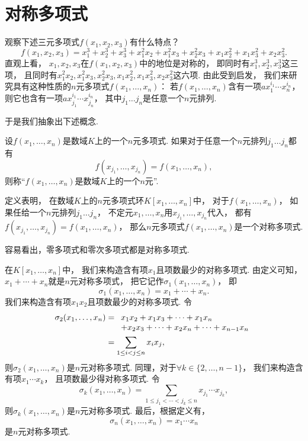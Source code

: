\section{对称多项式}
观察下述三元多项式\(f(x_1,x_2,x_3)\)有什么特点？
\[
	f(x_1,x_2,x_3)
	=x_1^3+x_2^3+x_3^3
	+x_1^2x_2
	+x_1^2x_3
	+x_2^2x_3
	+x_1x_2^2
	+x_1x_3^2
	+x_2x_3^2.
\]
直观上看，
\(x_1,x_2,x_3\)在\(f(x_1,x_2,x_3)\)中的地位是对称的，
即同时有\(x_1^3,x_2^3,x_3^3\)这三项，
且同时有\(x_1^2x_2,
x_1^2x_3,
x_2^2x_3,
x_1x_2^2,
x_1x_3^2,
x_2x_3^2\)这六项.
由此受到启发，
我们来研究具有这种性质的\(n\)元多项式\(f(x_1,\dotsc,x_n)\)：
若\(f(x_1,\dotsc,x_n)\)含有一项\(a x_1^{i_1} \dotsm x_n^{i_n}\)，
则它也含有一项\(a x_{j_1}^{i_1} \dotsm x_{j_n}^{i_n}\)，
其中\(j_1 \dotso j_n\)是任意一个\(n\)元排列.

于是我们抽象出下述概念.
\begin{definition}
设\(f(x_1,\dotsc,x_n)\)是数域\(K\)上的一个\(n\)元多项式.
如果对于任意一个\(n\)元排列\(j_1 \dotso j_n\)都有\[
	f(x_{j_1},\dotsc,x_{j_n})
	=f(x_1,\dotsc,x_n),
\]
则称“\(f(x_1,\dotsc,x_n)\)是数域\(K\)上的一个\(n\)元”.
\end{definition}

定义表明，
在数域\(K\)上的\(n\)元多项式环\(K[x_1,\dotsc,x_n]\)中，
对于\(f(x_1,\dotsc,x_n)\)，
如果任给一个\(n\)元排列\(j_1 \dotso j_n\)，
不定元\(x_1,\dotsc,x_n\)用\(x_{j_1},\dotsc,x_{j_n}\)代入，
都有\(f(x_{j_1},\dotsc,x_{j_n})=f(x_1,\dotsc,x_n)\)，
那么\(n\)元多项式\(f(x_1,\dotsc,x_n)\)是一个对称多项式.

容易看出，零多项式和零次多项式都是对称多项式.

在\(K[x_1,\dotsc,x_n]\)中，
我们来构造含有项\(x_1\)且项数最少的对称多项式.
由定义可知，
\(x_1+\dotsb+x_n\)就是\(n\)元对称多项式，
把它记作\(\sigma_1(x_1,\dotsc,x_n)\)，
即\[
	\sigma_1(x_1,\dotsc,x_n)
	=x_1+\dotsb+x_n.
\]
我们来构造含有项\(x_1x_2\)且项数最少的对称多项式.
令\begin{align*}
	\sigma_2(x_1,\dotsc,x_n)
	&=\begin{array}[t]{l}
		x_1x_2+x_1x_3+\dotsb+x_1x_n \\
		+x_2x_3+\dotsb+x_2x_n
		+\dotsb
		+x_{n-1}x_n
	\end{array} \\
	&=\sum_{1\leq i<j\leq n} x_i x_j,
\end{align*}
则\(\sigma_2(x_1,\dotsc,x_n)\)是\(n\)元对称多项式.
同理，对于\(\forall k\in\{2,\dotsc,n-1\}\)，
我们来构造含有项\(x_1 \dotsm x_k\)，
且项数最少得对称多项式.
令\[
	\sigma_k(x_1,\dotsc,x_n)
	=\sum_{1\leq j_1<\dotsb<j_k\leq n}
	x_{j_1} \dotsm x_{j_k},
\]
则\(\sigma_k(x_1,\dotsc,x_n)\)是\(n\)元对称多项式.
最后，根据定义有，\[
	\sigma_n(x_1,\dotsc,x_n)
	=x_1 \dotsm x_n
\]是\(n\)元对称多项式.

